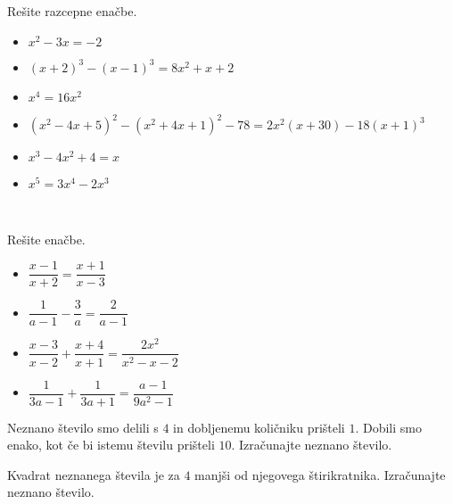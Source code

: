         
            \begin{naloga}
                Rešite razcepne enačbe.
                \begin{itemize}
                        \item $x^2-3x=-2$ 
                        \item $(x+2)^3-(x-1)^3=8x^2+x+2$ 
                        \item $x^4=16x^2$ 
                        \item $(x^2-4x+5)^2-(x^2+4x+1)^2-78=2x^2(x+30)-18(x+1)^3$ 
                        \item $x^3-4x^2+4=x$ 
                        \item $x^5=3x^4-2x^3$ 
                \end{itemize}
            \end{naloga}
        

~~\\
        
            \begin{naloga}
                Rešite enačbe.
                \begin{itemize}
                        \item $\dfrac{x-1}{x+2}=\dfrac{x+1}{x-3}$ 
                        \item $\dfrac{1}{a-1}-\dfrac{3}{a}=\dfrac{2}{a-1}$ 
                        \item $\dfrac{x-3}{x-2}+\dfrac{x+4}{x+1}=\dfrac{2x^2}{x^2-x-2}$ 
                        \item $\dfrac{1}{3a-1}+\dfrac{1}{3a+1}=\dfrac{a-1}{9a^2-1}$ 
                \end{itemize}
            \end{naloga}
        


        
            \begin{naloga}
                Neznano število smo delili s $4$ in dobljenemu količniku prišteli $1$. 
                Dobili smo enako, kot če bi istemu številu prišteli $10$. Izračunajte neznano število.
                
            \end{naloga}

            \begin{naloga}
                Kvadrat neznanega števila je za $4$ manjši od njegovega štirikratnika. Izračunajte neznano število.
                
            \end{naloga}

